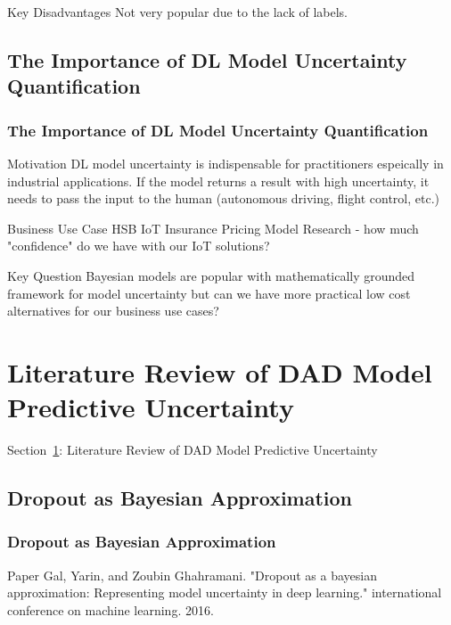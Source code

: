 \documentclass{beamer}
\begin{document}
\begin{frame}
\begin{frame}
\begin{frame}
\begin{block}{Key Disadvantages}
Not very popular due to the lack of labels.
\end{block}


\subsection{The Importance of DL Model Uncertainty Quantification}
\begin{frame}
\frametitle{The Importance of DL Model Uncertainty Quantification}
\begin{block}{Motivation}
DL model uncertainty is indispensable for practitioners espeically in industrial applications. If the model returns a result with high uncertainty, it needs to pass the input to the human (autonomous driving, flight control, etc.)
\end{block}

\begin{block}{Business Use Case}
HSB IoT Insurance Pricing Model Research - how much "confidence" do we have with our IoT solutions?
\end{block}

\begin{block}{Key Question}
Bayesian models are popular with mathematically grounded framework for model uncertainty but can we have more practical low cost alternatives for our business use cases?
\end{block}

\section{Literature Review of DAD Model Predictive Uncertainty}
\label{sec-review}
\begin{frame}
\centerline{Section~\ref{sec-review}: Literature Review of DAD Model Predictive Uncertainty}
\end{frame}


\subsection{Dropout as Bayesian Approximation}
\begin{frame}
\frametitle{Dropout as Bayesian Approximation}
\begin{block}{Paper}
Gal, Yarin, and Zoubin Ghahramani. "Dropout as a bayesian approximation: Representing model uncertainty in deep learning." international conference on machine learning. 2016.
\end{block}


\end{frame}
\end{frame}
\end{frame}
\end{frame}
\end{frame}
\end{document}
